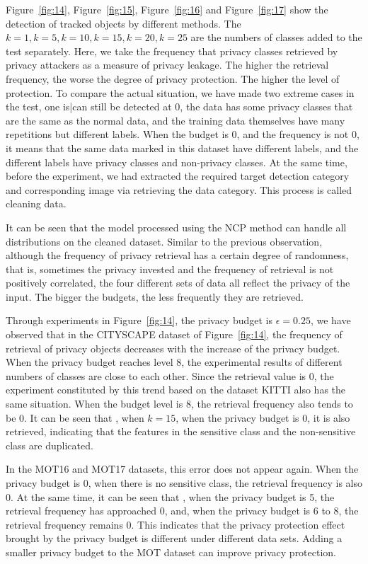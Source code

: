 \documentclass[trans]{IEEEtran}
\newcommand{\el}[1]{{\color{black}#1}}
\begin{document}
Figure~\ref{fig:14}, Figure~\ref{fig:15}, Figure~\ref{fig:16} and Figure~\ref{fig:17} show the detection of tracked objects by different methods. The  $k=1,k=5,k=10,k=15,k=20,k=25$ are the numbers of classes added to the test separately. Here, we take the frequency that privacy classes retrieved by privacy attackers as a measure of privacy leakage. The higher the retrieval frequency, the worse the degree of privacy protection. The higher the level of protection. To compare the actual situation, we \el{ have made two extreme cases in the test, one is|can still be detected at 0, the data has some privacy classes that are the same as the normal data, and the training data themselves have many repetitions but different labels. When the budget is 0, and the frequency is not 0, it means that the same data marked in this dataset have different labels, and the different labels have privacy classes and non-privacy classes. At the same time, before the experiment, we had extracted the required target detection category and corresponding image via} retrieving the data category. This process is called cleaning data. 

It can be seen that the model processed \el{using the NCP method can handle all distributions on the cleaned dataset. Similar to the previous observation, although the frequency of privacy retrieval has a certain degree of randomness, that is, sometimes the privacy invested and the frequency of retrieval is not positively correlated, the four different sets of data all reflect the privacy of the input. The bigger the budgets, the less frequently they are retrieved. }

Through experiments in Figure~\ref{fig:14}, the privacy budget is $\epsilon=0.25$, we \el{ have observed} that in the CITYSCAPE dataset of Figure~\ref{fig:14}, the frequency of retrieval of privacy objects decreases with the increase of the privacy budget. When the privacy budget reaches level 8, the experimental results of different numbers of classes are close to each other. Since the retrieval value is 0, the experiment constituted by this trend \el{ based on} the dataset KITTI also has the same situation. When the budget level is 8, the retrieval frequency also tends to be 0. It can be seen that \el{ ,} when $k=15$, when the privacy budget is 0, it is also retrieved, indicating that the features in the sensitive class and the non-sensitive class are duplicated. 

In the MOT16 and MOT17 datasets, this error does not appear again. When the privacy budget is 0, when there is no sensitive class, the retrieval frequency is also 0. At the same time, it can be seen that \el{ ,} when the privacy budget is 5, the retrieval frequency has approached 0, and, when the privacy budget is 6 to 8, the retrieval frequency remains 0. This \el{indicates} that the privacy protection effect brought by the privacy budget is different under different data sets. Adding a smaller privacy budget to the MOT dataset can improve privacy protection.
\end{document}
